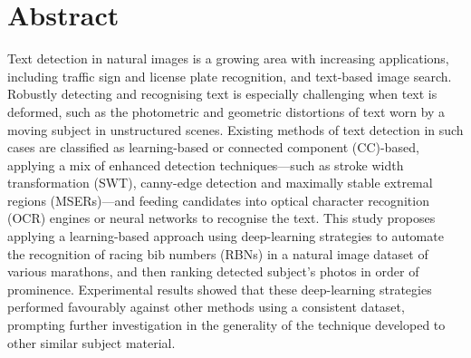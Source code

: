 \chapter*{Abstract}

Text detection in natural images is a growing area with increasing applications, including traffic sign and license plate recognition, and text-based image search.
Robustly detecting and recognising text is especially challenging when text is deformed, such as the photometric and geometric distortions of text worn by a moving subject in unstructured scenes.
Existing methods of text detection in such cases are classified as learning-based or connected component (CC)-based, applying a mix of enhanced detection techniques---such as stroke width transformation (SWT), canny-edge detection and maximally stable extremal regions (MSERs)---and feeding candidates into optical character recognition (OCR) engines or neural networks to recognise the text.
This study proposes applying a learning-based approach using deep-learning strategies to automate the recognition of racing bib numbers (RBNs) in a natural image dataset of various marathons, and then ranking detected subject's photos in order of prominence.
Experimental results showed that these deep-learning strategies performed favourably against other methods using a consistent dataset, prompting further investigation in the generality of the technique developed to other similar subject material.

